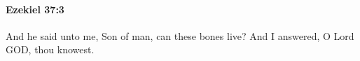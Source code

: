 
		\paragraph{Ezekiel 37:3} %
			\label{EZEKIEL-37-3}

			And he said unto me, Son of man, can these bones live? And I answered, O Lord GOD, thou knowest.


